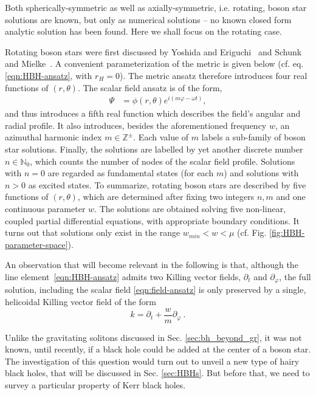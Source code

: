 Both spherically-symmetric as well as axially-symmetric, i.e. rotating, boson star solutions are known, but only as numerical solutions -- no known closed form analytic solution has been found.
Here we shall focus on the rotating case. 

Rotating boson stars were first discussed by Yoshida and Eriguchi~\cite{Yoshida:1997qf} and Schunk and Mielke~\cite{Schunck:1996he}.
A convenient parameterization of the metric is given below (cf. eq. \eqref{eqn:HBH-ansatz}, with $r_H=0$).
The metric ansatz therefore introduces four real functions of $(r,\theta)$.
The scalar field ansatz is of the form, 
\begin{align}
  \Psi &= \phi(r,\theta)e^{i(m\varphi-\omega t)},
  \label{eqn:field-ansatz}
\end{align}
and thus introduces a fifth real function which describes the field's angular and radial profile.
It also introduces, besides the aforementioned frequency $w$, an azimuthal harmonic index $m\in \mathbb{Z}^\pm$.
Each value of $m$ labels a sub-family of boson star solutions.
Finally, the solutions are labelled by yet another discrete number $n\in \mathbb{N}_0$, which counts the number of nodes of the scalar field profile.
Solutions with $n=0$ are regarded as fundamental states (for each $m$) and solutions with $n>0$ as excited states.
To summarize, rotating boson stars are described by five functions of $(r,\theta)$, which are determined after fixing two integers $n,m$ and one continuous parameter $w$.
The solutions are obtained solving five non-linear, coupled partial differential equations, with appropriate boundary conditions.
It turns out that solutions only exist in the range $w_{min}<w<\mu$ (cf. Fig. \ref{fig:HBH-parameter-space}).

An observation that will become relevant in the following is that, although the line element~\eqref{eqn:HBH-ansatz} admits two Killing vector fields, $\partial_t$ and $\partial_\varphi$, the full solution, including the scalar field \eqref{eqn:field-ansatz} is only preserved by a single, helicoidal Killing vector field of the form
\begin{equation}
k=\partial_t+\frac{w}{m}\partial_\varphi \ . 
\label{kvf}
\end{equation}

Unlike the gravitating solitons discussed in Sec. \ref{sec:bh_beyond_gr}, it was not known, until recently, if a black hole could be added at the center of a boson star.
The investigation of this question would turn out to unveil a new type of hairy black holes, that will be discussed in Sec. \ref{sec:HBHs}.
But before that, we need to survey a particular property of Kerr black holes. 
